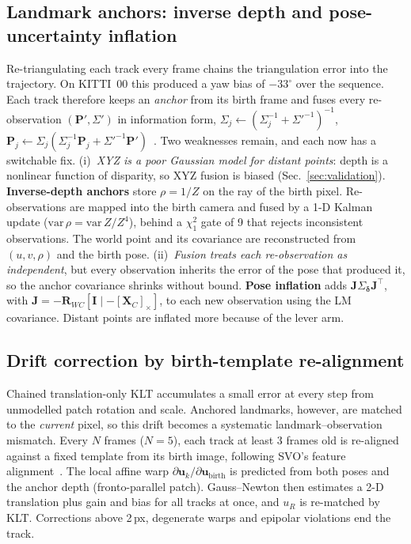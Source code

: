 \documentclass[11pt,a4paper]{article}
\begin{document}
\subsection{Landmark anchors: inverse depth and pose-uncertainty inflation}\label{sec:anchor}
Re-triangulating each track every frame chains the triangulation error into the trajectory. On KITTI~00 this produced a yaw bias of $-33^\circ$ over the sequence. Each track therefore keeps an \emph{anchor} from its birth frame and fuses every re-observation $(\mathbf P', \Sigma')$ in information form, $\Sigma_j \leftarrow (\Sigma_j^{-1} + \Sigma'^{-1})^{-1}$, $\mathbf P_j \leftarrow \Sigma_j(\Sigma_j^{-1}\mathbf P_j + \Sigma'^{-1}\mathbf P')$~\cite{badino}. Two weaknesses remain, and each now has a switchable fix.
(i)~\emph{XYZ is a poor Gaussian model for distant points}: depth is a nonlinear function of disparity, so XYZ fusion is biased (Sec.~\ref{sec:validation}). \textbf{Inverse-depth anchors} store $\rho = 1/Z$ on the ray of the birth pixel. Re-observations are mapped into the birth camera and fused by a 1-D Kalman update ($\mathrm{var}\,\rho = \mathrm{var}\,Z/Z^4$), behind a $\chi^2_1$ gate of 9 that rejects inconsistent observations. The world point and its covariance are reconstructed from $(u, v, \rho)$ and the birth pose.
(ii)~\emph{Fusion treats each re-observation as independent}, but every observation inherits the error of the pose that produced it, so the anchor covariance shrinks without bound. \textbf{Pose inflation} adds $\mathbf J\Sigma_{\boldsymbol\delta}\mathbf J^\top$, with $\mathbf J = -\mathbf R_{WC}[\mathbf I \mid -[\mathbf X_C]_\times]$, to each new observation using the LM covariance. Distant points are inflated more because of the lever arm.

\subsection{Drift correction by birth-template re-alignment}\label{sec:realign}
Chained translation-only KLT accumulates a small error at every step from unmodelled patch rotation and scale. Anchored landmarks, however, are matched to the \emph{current} pixel, so this drift becomes a systematic landmark--observation mismatch. Every $N$ frames ($N = 5$), each track at least 3 frames old is re-aligned against a fixed template from its birth image, following SVO's feature alignment~\cite{svo}. The local affine warp $\partial\mathbf u_k/\partial\mathbf u_{\mathrm{birth}}$ is predicted from both poses and the anchor depth (fronto-parallel patch). Gauss--Newton then estimates a 2-D translation plus gain and bias for all tracks at once, and $u_R$ is re-matched by KLT. Corrections above 2\,px, degenerate warps and epipolar violations end the track.
\end{document}

